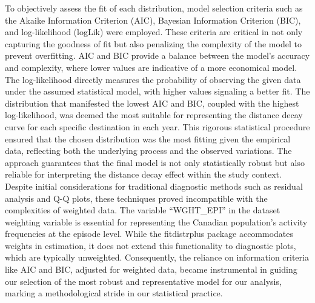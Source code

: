 \documentclass[12pt,twoside]{reedthesis}
\begin{document}
To objectively assess the fit of each distribution, model selection criteria such as the Akaike Information Criterion (AIC), Bayesian Information Criterion (BIC), and log-likelihood (logLik) were employed. These criteria are critical in not only capturing the goodness of fit but also penalizing the complexity of the model to prevent overfitting. AIC and BIC provide a balance between the model's accuracy and complexity, where lower values are indicative of a more economical model. The log-likelihood directly measures the probability of observing the given data under the assumed statistical model, with higher values signaling a better fit. The distribution that manifested the lowest AIC and BIC, coupled with the highest log-likelihood, was deemed the most suitable for representing the distance decay curve for each specific destination in each year. This rigorous statistical procedure ensured that the chosen distribution was the most fitting given the empirical data, reflecting both the underlying process and the observed variations. The approach guarantees that the final model is not only statistically robust but also reliable for interpreting the distance decay effect within the study context. Despite initial considerations for traditional diagnostic methods such as residual analysis and Q-Q plots, these techniques proved incompatible with the complexities of weighted data. The variable ``WGHT\_EPI'' in the dataset weighting variable is essential for representing the Canadian population's activity frequencies at the episode level. While the fitdistrplus package accommodates weights in estimation, it does not extend this functionality to diagnostic plots, which are typically unweighted. Consequently, the reliance on information criteria like AIC and BIC, adjusted for weighted data, became instrumental in guiding our selection of the most robust and representative model for our analysis, marking a methodological stride in our statistical practice.
\end{document}
